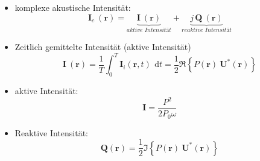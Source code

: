 \begin{itemize}
	\item komplexe akustische Intensität: \\
	\begin{equation}
	\mathbf{I}_c ~(\mathbf{r}) = \underbrace{\mathbf{I}~(\mathbf{r})}_{\textit{aktive Intensität}} + \underbrace{j\,\mathbf{Q}~(\mathbf{r})}_{\textit{reaktive~Intensität}}
	\label{helmholtz:equationIntensitaetComplex}
	\end{equation}	
			
	\item Zeitlich gemittelte Intensität (aktive Intensität) \\
	\begin{equation}
	\mathbf{I}~(\mathbf{r}) = \frac{1}{T}\int_0^T \mathbf{I}_i(\mathbf{r},t)\,~\mathrm{d}t = \frac{1}{2}\Re\left\{P(\mathbf{r})~\mathbf{U}^*(\mathbf{r})\right\}
	\end{equation}
	
	\item aktive Intensität: \\
	\begin{equation}
	\mathbf{I} = \frac{P^2}{2P_0\omega}
	\label{helmholtz:equationAktiveIntensitaet}
	\end{equation}
	
	\item Reaktive Intensität: \\
	\begin{equation}
	\mathbf{Q}(\mathbf{r}) = \frac{1}{2}\Im\left\{P(\mathbf{r})~\mathbf{U}^*(\mathbf{r})\right\}
	\label{helmholtz:equationReaktiveIntensitaet}
	\end{equation}
	
\end{itemize}
